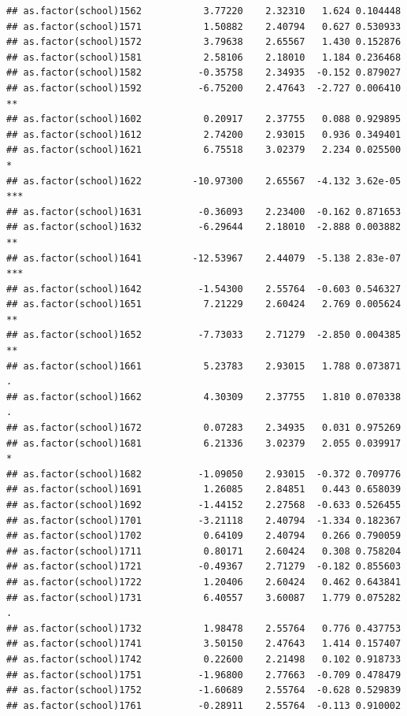 \documentclass[ignorenonframetext,]{beamer}
\begin{document}
\begin{frame}[fragile]{}
\begin{verbatim}
## as.factor(school)1562           3.77220    2.32310   1.624 0.104448    
## as.factor(school)1571           1.50882    2.40794   0.627 0.530933    
## as.factor(school)1572           3.79638    2.65567   1.430 0.152876    
## as.factor(school)1581           2.58106    2.18010   1.184 0.236468    
## as.factor(school)1582          -0.35758    2.34935  -0.152 0.879027    
## as.factor(school)1592          -6.75200    2.47643  -2.727 0.006410 ** 
## as.factor(school)1602           0.20917    2.37755   0.088 0.929895    
## as.factor(school)1612           2.74200    2.93015   0.936 0.349401    
## as.factor(school)1621           6.75518    3.02379   2.234 0.025500 *  
## as.factor(school)1622         -10.97300    2.65567  -4.132 3.62e-05 ***
## as.factor(school)1631          -0.36093    2.23400  -0.162 0.871653    
## as.factor(school)1632          -6.29644    2.18010  -2.888 0.003882 ** 
## as.factor(school)1641         -12.53967    2.44079  -5.138 2.83e-07 ***
## as.factor(school)1642          -1.54300    2.55764  -0.603 0.546327    
## as.factor(school)1651           7.21229    2.60424   2.769 0.005624 ** 
## as.factor(school)1652          -7.73033    2.71279  -2.850 0.004385 ** 
## as.factor(school)1661           5.23783    2.93015   1.788 0.073871 .  
## as.factor(school)1662           4.30309    2.37755   1.810 0.070338 .  
## as.factor(school)1672           0.07283    2.34935   0.031 0.975269    
## as.factor(school)1681           6.21336    3.02379   2.055 0.039917 *  
## as.factor(school)1682          -1.09050    2.93015  -0.372 0.709776    
## as.factor(school)1691           1.26085    2.84851   0.443 0.658039    
## as.factor(school)1692          -1.44152    2.27568  -0.633 0.526455    
## as.factor(school)1701          -3.21118    2.40794  -1.334 0.182367    
## as.factor(school)1702           0.64109    2.40794   0.266 0.790059    
## as.factor(school)1711           0.80171    2.60424   0.308 0.758204    
## as.factor(school)1721          -0.49367    2.71279  -0.182 0.855603    
## as.factor(school)1722           1.20406    2.60424   0.462 0.643841    
## as.factor(school)1731           6.40557    3.60087   1.779 0.075282 .  
## as.factor(school)1732           1.98478    2.55764   0.776 0.437753    
## as.factor(school)1741           3.50150    2.47643   1.414 0.157407    
## as.factor(school)1742           0.22600    2.21498   0.102 0.918733    
## as.factor(school)1751          -1.96800    2.77663  -0.709 0.478479    
## as.factor(school)1752          -1.60689    2.55764  -0.628 0.529839    
## as.factor(school)1761          -0.28911    2.55764  -0.113 0.910002    

\end{verbatim}
\end{frame}
\end{document}
